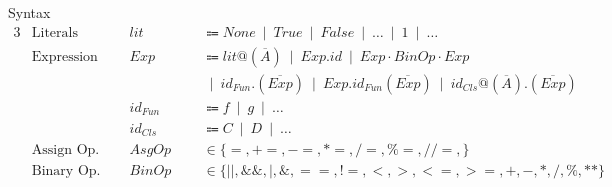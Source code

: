 \documentclass[11pt]{jarticle}
\begin{document}
Syntax
\begin{alignat*}{3} %
  &\text{Literals} &&lit &&\Coloneqq None ~\mid~ True ~\mid~ False ~\mid~  \dots ~\mid~ 1 ~\mid~ \dots\\
  &\text{Expression}~~~ &&Exp &&\Coloneqq lit@(\overline{A}) ~\mid~ Exp.id ~\mid~ Exp \cdot BinOp \cdot Exp \\
  &&&&&~\mid~ id_{Fun}.(\overline{Exp}) ~\mid~ Exp.id_{Fun}(\overline{Exp}) ~\mid~ id_{Cls}@(\overline{A}).(\overline{Exp})\\
  &&&id_{Fun} &&\Coloneqq f ~\mid~ g ~\mid~ \dots\\
  &&&id_{Cls} &&\Coloneqq C ~\mid~ D ~\mid~ \dots\\
  &\text{Assign Op.} &&AsgOp~~~ &&\in \{=, +=, -=, *=, /=,\%=, //=,\}\\
  &\text{Binary Op.} &&BinOp &&\in \{||, \&\&, |, \&, ==, !=, <, >, <=, >=, +, -, *, /, \%, **\}
\end{alignat*}
\end{document}
